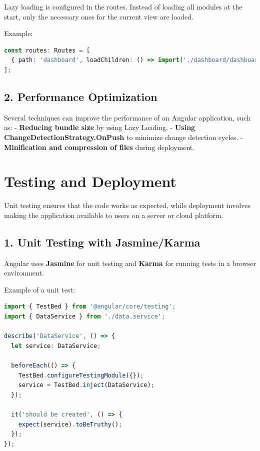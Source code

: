 \documentclass{article}
\begin{document}
Lazy loading is configured in the routes. Instead of loading all modules at the start, only the necessary ones for the current view are loaded.

Example:
\begin{lstlisting}[language=TypeScript, caption={Lazy Loading Example}, label={lst:lazy-loading}]
const routes: Routes = [
  { path: 'dashboard', loadChildren: () => import('./dashboard/dashboard.module').then(m => m.DashboardModule) }
];
\end{lstlisting}

\subsection*{2. Performance Optimization}

Several techniques can improve the performance of an Angular application, such as:
- \textbf{Reducing bundle size} by using Lazy Loading.
- \textbf{Using ChangeDetectionStrategy.OnPush} to minimize change detection cycles.
- \textbf{Minification and compression of files} during deployment.
\section*{Testing and Deployment}

Unit testing ensures that the code works as expected, while deployment involves making the application available to users on a server or cloud platform.

\subsection*{1. Unit Testing with Jasmine/Karma}

Angular uses \textbf{Jasmine} for unit testing and \textbf{Karma} for running tests in a browser environment.

Example of a unit test:
\begin{lstlisting}[language=TypeScript, caption={Unit Test Example}, label={lst:typescript-unit-test}]
import { TestBed } from '@angular/core/testing';
import { DataService } from './data.service';

describe('DataService', () => {
  let service: DataService;

  beforeEach(() => {
    TestBed.configureTestingModule({});
    service = TestBed.inject(DataService);
  });

  it('should be created', () => {
    expect(service).toBeTruthy();
  });
});
\end{lstlisting}
\end{document}
